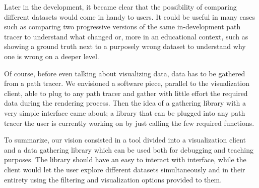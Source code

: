 Later in the development, it became clear that the possibility of comparing different datasets would come in handy to users. It could be useful in many cases such as comparing two progressive versions of the same in-development path tracer to understand what changed or, more in an educational context, such as showing a ground truth next to a purposely wrong dataset to understand why one is wrong on a deeper level.

Of course, before even talking about visualizing data, data has to be gathered from a path tracer. We envisioned a software piece, parallel to the visualization client, able to plug to any path tracer and gather with little effort the required data during the rendering process. Then the idea of a gathering library with a very simple interface came about; a library that can be plugged into any path tracer the user is currently working on by just calling the few required functions.

To summarize, our vision consisted in a tool divided into a visualization client and a data gathering library which can be used both for debugging and teaching purposes. The library should have an easy to interact with interface, while the client would let the user explore different datasets simultaneously and in their entirety using the filtering and visualization options provided to them.



